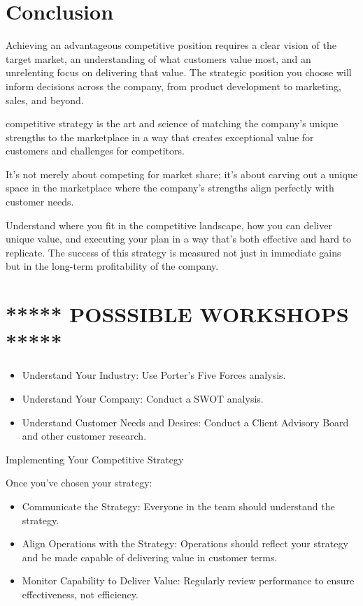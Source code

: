 \documentclass[
]{book}
\begin{document}
\hypertarget{conclusion}{%
\section{Conclusion}\label{conclusion}}

Achieving an advantageous competitive position requires a clear vision of the target market, an understanding of what customers value most, and an unrelenting focus on delivering that value. The strategic position you choose will inform decisions across the company, from product development to marketing, sales, and beyond.

competitive strategy is the art and science of matching the company's unique strengths to the marketplace in a way that creates exceptional value for customers and challenges for competitors.

It's not merely about competing for market share; it's about carving out a unique space in the marketplace where the company's strengths align perfectly with customer needs.

Understand where you fit in the competitive landscape, how you can deliver unique value, and executing your plan in a way that's both effective and hard to replicate. The success of this strategy is measured not just in immediate gains but in the long-term profitability of the company.

\hypertarget{posssible-workshops}{%
\section{***** POSSSIBLE WORKSHOPS *****}\label{posssible-workshops}}

\begin{itemize}
\item
  Understand Your Industry: Use Porter's Five Forces analysis.
\item
  Understand Your Company: Conduct a SWOT analysis.
\item
  Understand Customer Needs and Desires: Conduct a Client Advisory Board and other customer research.
\end{itemize}

Implementing Your Competitive Strategy

Once you've chosen your strategy:

\begin{itemize}
\item
  Communicate the Strategy: Everyone in the team should understand the strategy.
\item
  Align Operations with the Strategy: Operations should reflect your strategy and be made capable of delivering value in customer terms.
\item
  Monitor Capability to Deliver Value: Regularly review performance to ensure effectiveness, not efficiency.
\end{itemize}
\end{document}
